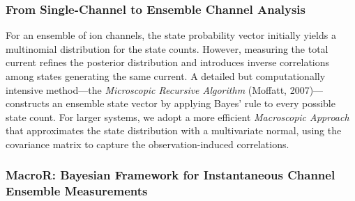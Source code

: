 \documentclass[pdflatex,sn-nature]{sn-jnl}%
\theoremstyle{thmstyleone}%
\theoremstyle{thmstyletwo}%
\theoremstyle{thmstylethree}%
\begin{document}
\subsubsection{From Single-Channel to Ensemble Channel Analysis}

For an ensemble of ion channels, the state probability vector initially yields a multinomial distribution for the state counts. However, measuring the total current refines the posterior distribution and introduces inverse correlations among states generating the same current. A detailed but computationally intensive method—the \textit{Microscopic Recursive Algorithm} (Moffatt, 2007)—constructs an ensemble state vector by applying Bayes’ rule to every possible state count. For larger systems, we adopt a more efficient \textit{Macroscopic Approach} that approximates the state distribution with a multivariate normal, using the covariance matrix to capture the observation-induced correlations.
\subsubsection{MacroR: Bayesian Framework for Instantaneous Channel Ensemble Measurements}
\end{document}

